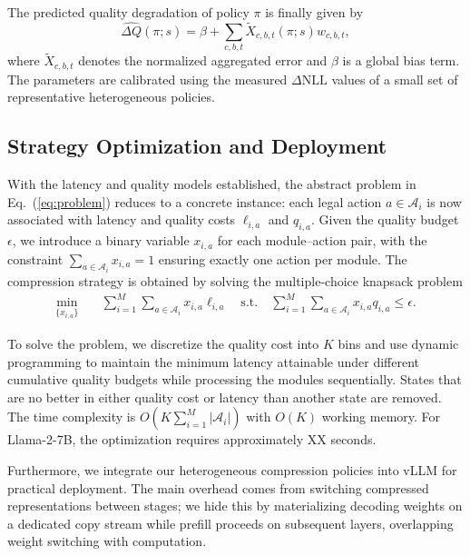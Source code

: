 \documentclass[letterpaper]{article} %
\begin{document}
The predicted quality degradation of policy $\pi$ is finally given by
\begin{equation}
\widehat{\Delta Q}(\pi;s)
=
\beta
+
\sum_{c,b,t}
\widetilde{X}_{c,b,t}(\pi;s)
w_{c,b,t},
\end{equation}
where $\widetilde{X}_{c,b,t}$ denotes the normalized aggregated error and $\beta$ is a global bias term. The parameters are calibrated using the measured $\Delta\mathrm{NLL}$ values of a small set of representative heterogeneous policies.

\subsection{Strategy Optimization and Deployment}

With the latency and quality models established, the abstract problem in Eq.~(\ref{eq:problem}) reduces to a concrete instance: each legal action $a\in\mathcal{A}_i$ is now associated with latency and quality costs $\ell_{i,a}$ and $q_{i,a}$. Given the quality budget $\epsilon$, we introduce a binary variable $x_{i,a}$ for each module--action pair, with the constraint $\sum_{a\in\mathcal{A}_i}x_{i,a}=1$ ensuring exactly one action per module. The compression strategy is obtained by solving the multiple-choice knapsack problem
\begin{equation}
\begin{aligned}
\min_{\{x_{i,a}\}}\quad
& \sum_{i=1}^{M}\sum_{a\in\mathcal{A}_i}
x_{i,a}\ell_{i,a}
\quad
\mathrm{s.t.}\quad
\sum_{i=1}^{M}\sum_{a\in\mathcal{A}_i}
x_{i,a}q_{i,a}\leq \epsilon.
\end{aligned}
\end{equation}

To solve the problem, we discretize the quality cost into $K$ bins and use dynamic programming to maintain the minimum latency attainable under different cumulative quality budgets while processing the modules sequentially. States that are no better in either quality cost or latency than another state are removed. The time complexity is $O(K\sum_{i=1}^{M}|\mathcal{A}_i|)$ with $O(K)$ working memory. For Llama-2-7B, the optimization requires approximately XX seconds.



Furthermore, we integrate our heterogeneous compression policies into vLLM for practical deployment. The main overhead comes from switching compressed representations between stages; we hide this by materializing decoding weights on a dedicated copy stream while prefill proceeds on subsequent layers, overlapping weight switching with computation.
\end{document}
